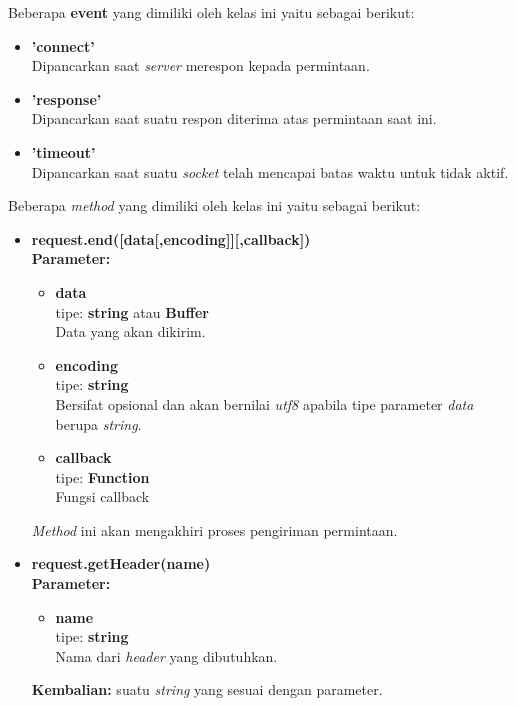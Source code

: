 \begin{enumerate}
	Beberapa \textbf{event} yang dimiliki oleh kelas ini yaitu sebagai berikut:
		\begin{itemize}
			\item \textbf{'connect'} \\ Dipancarkan saat \textit{server} merespon kepada permintaan.
			\item \textbf{'response'} \\ Dipancarkan saat suatu respon diterima atas permintaan saat ini.
			\item \textbf{'timeout'} \\ Dipancarkan saat suatu \textit{socket} telah mencapai batas waktu untuk tidak aktif.
		\end{itemize}

	Beberapa \textit{method} yang dimiliki oleh kelas ini yaitu sebagai berikut:
		\begin{itemize}
			\item \textbf{request.end([data[,encoding]][,callback])} \\ 
			\textbf{Parameter:} 
			\begin{itemize}
				\item \textbf{data} \\tipe: \textbf{string} atau \textbf{Buffer} \\ Data yang akan dikirim.
				\item \textbf{encoding} \\tipe: \textbf{string} \\ Bersifat opsional dan akan bernilai \textit{utf8} apabila tipe parameter \textit{data} berupa \textit{string}.
				\item \textbf{callback} \\tipe:	\textbf{Function} \\ Fungsi callback
			\end{itemize}
		
			\textit{Method} ini akan mengakhiri proses pengiriman permintaan.
			
			\item \textbf{request.getHeader(name)} \\
			\textbf{Parameter:} 
			\begin{itemize}
				\item \textbf{name} \\tipe: \textbf{string} \\ Nama dari \textit{header} yang dibutuhkan.
			\end{itemize}
			\textbf{Kembalian:} suatu \textit{string} yang sesuai dengan parameter.
			

\end{itemize}
\end{enumerate}
